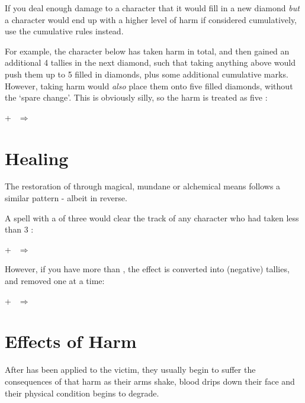 If you deal enough damage to a character that it would fill in a new diamond {\it but} a character would end up with a higher level of harm if considered cumulatively, use the cumulative rules instead. 

For example, the character below has taken  harm in total, and then gained an additional 4 tallies in the next diamond, such that taking anything above  would push them up to 5 filled in diamonds, plus some additional cumulative marks. However, taking  harm would {\it also} place them onto five filled diamonds, without the `spare change'. This is obviously silly, so the harm is treated as five :


\begin{center}
	 + $~~\Longrightarrow~~$
\end{center}



\section{Healing}

The restoration of  through magical, mundane or alchemical means follows a similar pattern - albeit in reverse. 

A  spell with a  of three would clear the  track of any character who had taken less than 3 :

\begin{center}
	 + $~~\Longrightarrow~~$
\end{center}

However, if you have more  than , the effect is converted into (negative) tallies, and removed one at a time:

\begin{center}
	 + $~~\Longrightarrow~~$
\end{center}

\section{Effects of Harm}

After  has been applied to the victim, they usually begin to suffer the consequences of that harm as their arms shake, blood drips down their face and their physical condition begins to degrade. 

